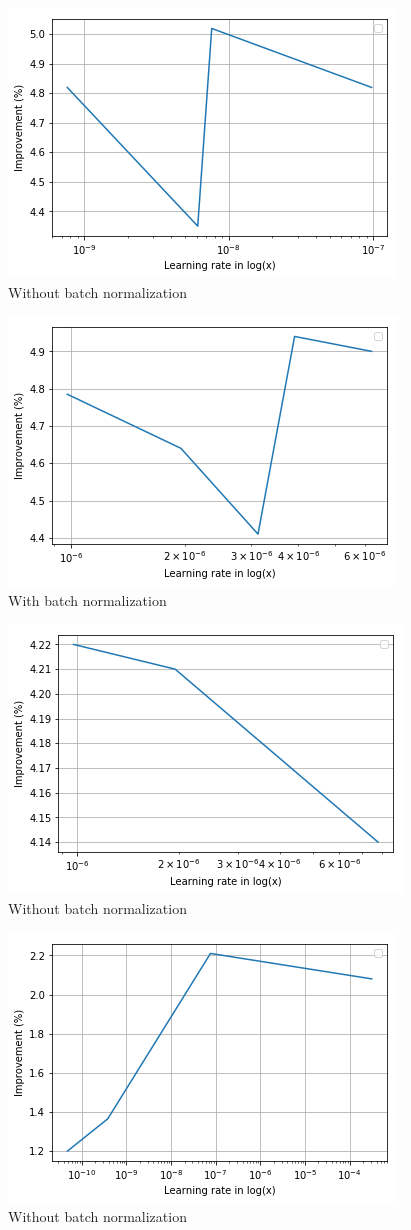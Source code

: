 \begin{figure}[h]
    \centering
    \includegraphics[width=.5\textwidth]{assets/appendix/plot_group25.png}
    \caption{Without batch normalization}
    \label{fig:ch_5_plot25}
\end{figure}
\begin{figure}[h]
    \centering
    \includegraphics[width=.5\textwidth]{assets/appendix/plot_group21.png}
    \caption{With batch normalization}
    \label{fig:ch_5_plot21}
\end{figure}
\begin{figure}[h]
    \centering
    \includegraphics[width=.65\textwidth]{assets/appendix/plot_group23.png}
    \caption{Without batch normalization}
    \label{fig:ch_5_plot23}
\end{figure}
\begin{figure}[h]
    \centering
    \includegraphics[width=.65\textwidth]{assets/appendix/plot_group1.png}
    \caption{Without batch normalization}
    \label{fig:ch_5_plot1}
\end{figure}
